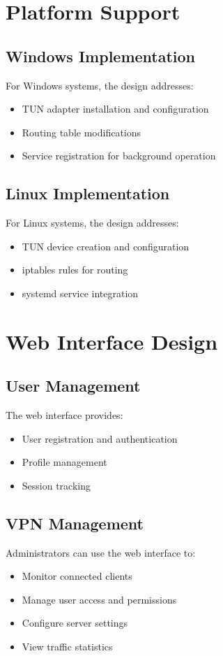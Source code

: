 \documentclass[12pt,a4paper]{report}
\begin{document}
\section{Platform Support}
\subsection{Windows Implementation}
For Windows systems, the design addresses:
\begin{itemize}
    \item TUN adapter installation and configuration
    \item Routing table modifications
    \item Service registration for background operation
\end{itemize}

\subsection{Linux Implementation}
For Linux systems, the design addresses:
\begin{itemize}
    \item TUN device creation and configuration
    \item iptables rules for routing
    \item systemd service integration
\end{itemize}

\section{Web Interface Design}
\subsection{User Management}
The web interface provides:
\begin{itemize}
    \item User registration and authentication
    \item Profile management
    \item Session tracking
\end{itemize}

\subsection{VPN Management}
Administrators can use the web interface to:
\begin{itemize}
    \item Monitor connected clients
    \item Manage user access and permissions
    \item Configure server settings
    \item View traffic statistics
\end{itemize}
\end{document}
